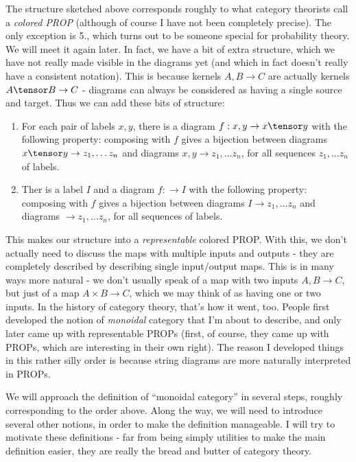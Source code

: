 \documentclass{article}
\begin{document}
The structure sketched above corresponds roughly to what category theorists call a \emph{colored PROP} (although of course I have not been completely precise).
The only exception is 5., which turns out to be someone special for probability theory. We will meet it again later.
In fact, we have a bit of extra structure, which we have not really made visible in the diagrams yet (and which in fact doesn't really have a consistent notation).
This is because kernels $A,B \to C$ are actually kernels $A \tensor B \to C$ - diagrams can always be considered as having a single source and target.
Thus we can add these bits of structure:
\begin{enumerate}
    \item For each pair of labels $x,y$, there is a diagram $f: x,y \to x\tensor y$ with the following property: composing with $f$ gives a bijection between diagrams $x \tensor y \to z_1, \dots z_n$ and diagrams $x,y \to z_1, \dots z_n$, for all sequences $z_1, \dots z_n$ of labels.
    \item Ther is a label $I$ and a diagram $f: \to I$ with the following property: composing with $f$ gives a bijection between diagrams $I \to z_1, \dots z_n$ and diagrams $\to z_1, \dots z_n$, for all sequences of labels.
\end{enumerate}
This makes our structure into a \emph{representable} colored PROP.
With this, we don't actually need to discuss the maps with multiple inputs and outputs - they are completely described by describing single input/output maps.
This is in many ways more natural - we don't usually speak of a map with two inputs $A, B \to C$, but just of a map $A \times B \to C$, which we may think of as having one or two inputs.
In the history of category theory, that's how it went, too. People first developed the notion of \emph{monoidal} category that I'm about to describe, and only later came up with representable PROPs (first, of course, they came up with PROPs, which are interesting in their own right).
The reason I developed things in this rather silly order is because string diagrams are more naturally interpreted in PROPs.

We will approach the definition of ``monoidal category'' in several steps, roughly corresponding to the order above.
Along the way, we will need to introduce several other notions, in order to make the definition manageable.
I will try to motivate these definitions - far from being simply utilities to make the main definition easier, they are really the bread and butter of category theory.
\end{document}
